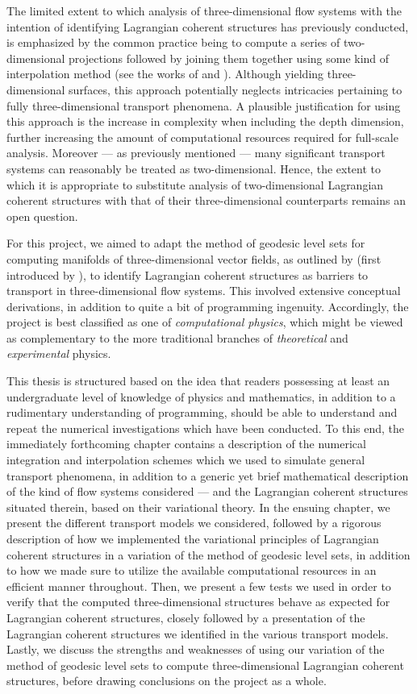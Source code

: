 The limited extent to which analysis of three-dimensional flow systems with the
intention of identifying Lagrangian coherent structures has previously
conducted, is emphasized by the common practice being to compute a series of
two-dimensional projections followed by joining them together using
some kind of interpolation method (see the works of
\textcite{blazevski2014hyperbolic} and \textcite{oettinger2016autonomous}).
Although yielding three-dimensional surfaces, this approach potentially
neglects intricacies pertaining to fully three-dimensional transport phenomena.
A plausible justification for using this approach is the increase in complexity
when including the depth dimension, further increasing the amount of
computational resources required for full-scale analysis. Moreover --- as
previously mentioned --- many significant transport systems can reasonably be
treated as two-dimensional. Hence, the extent to which it is appropriate to
substitute analysis of two-dimensional Lagrangian coherent structures with that
of their three-dimensional counterparts remains an open question.

For this project, we aimed to adapt the method of geodesic level sets for
computing manifolds of three-dimensional vector fields, as outlined by
\textcite{krauskopf2005survey} (first introduced by
\textcite{krauskopf2003computing}), to identify Lagrangian coherent structures
as barriers to transport in three-dimensional flow systems. This involved
extensive conceptual derivations, in addition to quite a bit of programming
ingenuity. Accordingly, the project is best classified as one of
\emph{computational physics}, which might be viewed as complementary to the
more traditional branches of \emph{theoretical} and \emph{experimental}
physics.

This thesis is structured based on the idea that readers possessing
at least an undergraduate level of knowledge of physics and mathematics, in
addition to a rudimentary understanding of programming, should be able to
understand and repeat the numerical investigations which have been conducted.
To this end, the immediately forthcoming chapter contains a description of the
numerical integration and interpolation schemes which we used to simulate
general transport phenomena, in addition to a generic yet brief mathematical
description of the kind of flow systems considered --- and the Lagrangian
coherent structures situated therein, based on their variational theory. In the
ensuing chapter, we present the different transport models we considered,
followed by a rigorous description of how we implemented the variational
principles of Lagrangian coherent structures in a variation of the method of
geodesic level sets, in addition to how we made sure to utilize the available
computational resources in an efficient manner throughout. Then, we present a
few tests we used in order to verify that the computed three-dimensional
structures behave as expected for Lagrangian coherent structures, closely
followed by a presentation of the Lagrangian coherent structures we identified
in the various transport models. Lastly, we discuss the strengths and
weaknesses of using our variation of the method of geodesic level sets to
compute three-dimensional Lagrangian coherent structures, before drawing
conclusions on the project as a whole.
